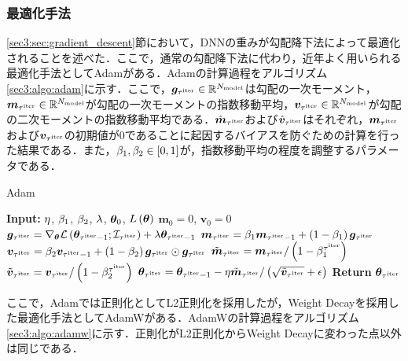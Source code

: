 \subsubsection{最適化手法}
\label{sec3:sec:optimizer}
\ref{sec3:sec:gradient_descent}節において，DNNの重みが勾配降下法によって最適化されることを述べた．ここで，通常の勾配降下法に代わり，近年よく用いられる最適化手法としてAdam\cite{kingma2014adam}がある．Adamの計算過程をアルゴリズム\ref{sec3:algo:adam}に示す．ここで，$\bm{g}_{\tau^{\text{iter}}} \in \mathbb{R}^{N_{\text{model}}}$は勾配の一次モーメント，$\bm{m}_{\tau^{\text{iter}}} \in \mathbb{R}^{N_{\text{model}}}$が勾配の一次モーメントの指数移動平均，$\bm{v}_{\tau^{\text{iter}}} \in \mathbb{R}^{N_{\text{model}}}$が勾配の二次モーメントの指数移動平均である．$\hat{\bm{m}}_{\tau^{\text{iter}}}$および$\hat{\bm{v}}_{\tau^{\text{iter}}}$はそれぞれ，$\bm{m}_{\tau^{\text{iter}}}$および$\bm{v}_{\tau^{\text{iter}}}$の初期値が0であることに起因するバイアスを防ぐための計算を行った結果である．また，$\beta_{1}, \beta_{2} \in \left[0, 1\right]$が，指数移動平均の程度を調整するパラメータである．
\begin{algorithm}
    \caption{Adam}
    \label{sec3:algo:adam}
    \begin{algorithmic}[1]
        \State \textbf{Input:} $\eta$, $\beta_{1}$, $\beta_{2}$, $\lambda$, $\bm{\theta}_{0}$, $L\left(\bm{\theta}\right)$
        \State $\bm{m}_{0} = 0$, $\bm{v}_{0} = 0$
        \State $\bm{g}_{\tau^{\text{iter}}} = \nabla_{\bm{\theta}} \mathcal{L}\left(\bm{\theta}_{\tau^{\text{iter}} - 1}; \mathcal{I}_{\tau^{\text{iter}}}\right) + \lambda \bm{\theta}_{\tau^{\text{iter}}-1}$
        \State $\bm{m}_{\tau^{\text{iter}}} = \beta_{1} \bm{m}_{\tau^{\text{iter}}-1} + \left(1 - \beta_{1}\right) \bm{g}_{\tau^{\text{iter}}}$
        \State $\bm{v}_{\tau^{\text{iter}}} = \beta_{2} \bm{v}_{\tau^{\text{iter}}-1} + \left(1 - \beta_{2}\right) \bm{g}_{\tau^{\text{iter}}} \odot \bm{g}_{\tau^{\text{iter}}}$
        \State $\tilde{\bm{m}}_{\tau^{\text{iter}}} = \bm{m}_{\tau^{\text{iter}}} / \left(1 - \beta_{1}^{\tau^{\text{iter}}}\right)$
        \State $\tilde{\bm{v}}_{\tau^{\text{iter}}} = \bm{v}_{\tau^{\text{iter}}} / \left(1 - \beta_{2}^{\tau^{\text{iter}}}\right)$
        \State $\bm{\theta}_{\tau^{\text{iter}}} = \bm{\theta}_{\tau^{\text{iter}}-1} - \eta \tilde{\bm{m}}_{\tau^{\text{iter}}} / \left(\sqrt{\tilde{\bm{v}}_{\tau^{\text{iter}}}} + \epsilon\right)$
        \EndFor
        \State \textbf{Return} $\bm{\theta}_{\tau^{\text{iter}}}$
    \end{algorithmic}
\end{algorithm}
ここで，Adamでは正則化としてL2正則化を採用したが，Weight Decayを採用した最適化手法としてAdamW\cite{loshchilov2017decoupled}がある．AdamWの計算過程をアルゴリズム\ref{sec3:algo:adamw}に示す．正則化がL2正則化からWeight Decayに変わった点以外は同じである．
